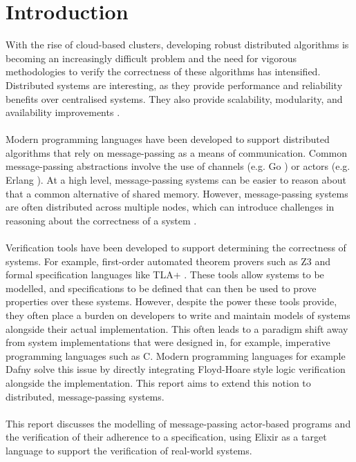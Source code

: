 \chapter{Introduction}
With the rise of cloud-based clusters, developing robust distributed algorithms is becoming an increasingly difficult problem and the need for vigorous methodologies to verify the correctness of these algorithms has intensified. Distributed systems are interesting, as they provide performance and reliability benefits over centralised systems. They also provide scalability, modularity, and availability improvements \cite{cachin}.
\\ \\ 
Modern programming languages have been developed to support distributed algorithms that rely on message-passing as a means of communication. Common message-passing abstractions involve the use of channels (e.g. Go \cite{go}) or actors \cite{actor} (e.g. Erlang \cite{erlang}). At a high level, message-passing systems can be easier to reason about that a common alternative of shared memory. However, message-passing systems are often distributed across multiple nodes, which can introduce challenges in reasoning about the correctness of a system \cite{science_of_systems}.
\\ \\
Verification tools have been developed to support determining the correctness of systems. For example, first-order automated theorem provers such as Z3 \cite{z3} and formal specification languages like TLA+ \cite{tlaplus}. These tools allow systems to be modelled, and specifications to be defined that can then be used to prove properties over these systems. However, despite the power these tools provide, they often place a burden on developers to write and maintain models of systems alongside their actual implementation. This often leads to a paradigm shift away from system implementations that were designed in, for example, imperative programming languages such as C. Modern programming languages for example Dafny \cite{dafny} solve this issue by directly integrating Floyd-Hoare style logic verification alongside the implementation. This report aims to extend this notion to distributed, message-passing systems.
\\ \\
This report discusses the modelling of message-passing actor-based programs and the verification of their adherence to a specification, using Elixir as a target language to support the verification of real-world systems.
